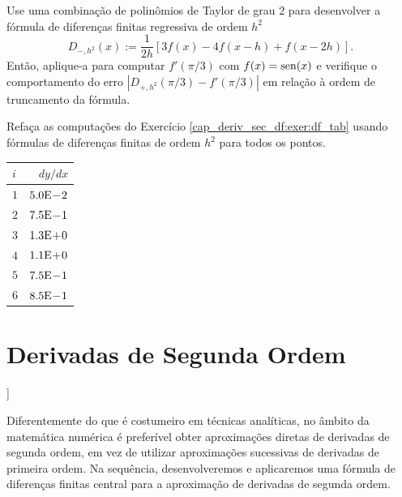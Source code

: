 \begin{exer}
  Use uma combinação de polinômios de Taylor de grau 2 para desenvolver a fórmula de diferenças finitas regressiva de ordem $h^2$
  \begin{equation}\label{cap_deriv_sec_df:eq:dfr_h2}
    D_{-,h^2}(x) := \frac{1}{2h}\left[3f(x) - 4f(x-h) + f(x-2h)\right].
  \end{equation}
  Então, aplique-a para computar $f'(\pi/3)$ com $f(x)=\operatorname{sen}(x)$ e verifique o comportamento do erro $|D_{+,h^2}(\pi/3) - f'(\pi/3)|$ em relação à ordem de truncamento da fórmula.
\end{exer}

\begin{exer}
  Refaça as computações do Exercício \ref{cap_deriv_sec_df:exer:df_tab} usando fórmulas de diferenças finitas de ordem $h^2$ para todos os pontos.
\end{exer}
\begin{resp}
  \begin{center}
    \begin{tabular}{l|r}
      $i$ & $dy/dx$\\\hline
      $1$ & $5.0\mathrm{E}\!-\!2$\\
      $2$ & $7.5\mathrm{E}\!-\!1$\\
      $3$ & $1.3\mathrm{E}\!+\!0$\\
      $4$ & $1.1\mathrm{E}\!+\!0$\\
      $5$ & $7.5\mathrm{E}\!-\!1$\\
      $6$ & $8.5\mathrm{E}\!-\!1$\\\hline
    \end{tabular}
  \end{center}  
\end{resp}

\section{Derivadas de Segunda Ordem}\label{cap_deriv_sec_d2f}

\begin{flushleft}
  [[tag:revisar]]
\end{flushleft}

Diferentemente do que é costumeiro em técnicas analíticas, no âmbito da matemática numérica é preferível obter aproximações diretas de derivadas de segunda ordem, em vez de utilizar aproximações sucessivas de derivadas de primeira ordem. Na sequência, desenvolveremos e aplicaremos uma fórmula de diferenças finitas central para a aproximação de derivadas de segunda ordem.


